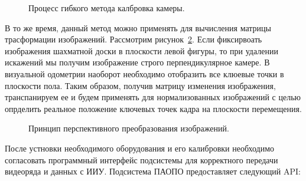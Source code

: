 \begin{figure}[!h]
\caption{Процесс гибкого метода калбровка камеры.}
\label{pic:calibrationMan}
\end{figure}

В то же время, данный метод можно применять для вычисления матрицы трасформации изображений. Рассмотрим рисунок~\ref{pic:perspectiveTranform}. Если фиксирвоать изображения шахматной доски в плоскости левой фигуры, то при удалении искажений мы получим изображение строго перпендикулярное камере. В визуальной одометрии наоборот необходимо отобразить все клюевые точки в плоскости пола. Таким образом, получив матрицу изменения изображения, транспанируем ее и будем применять для нормализованных изображений с целью опрделить реальное положение ключевых точек кадра на плоскости перемещения. 

\begin{figure}[!h]
\caption{Принцип перспективного преобразования изображений.}
\label{pic:perspectiveTranform}
\end{figure}

После устновки необходимого оборудования и его калибровки необходимо согласовать программный интерфейс подсистемы для корректного передачи видеоряда и данных с ИИУ. 
Подсистема ПАОПО предоставляет следующий API:

